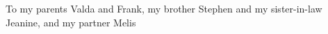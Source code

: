 
To my parents Valda and Frank, \newline my brother Stephen and my sister-in-law Jeanine, \newline and my partner Melis